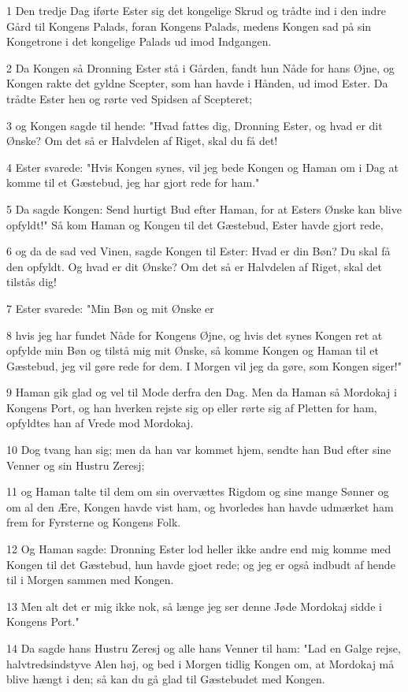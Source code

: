\par 1 Den tredje Dag iførte Ester sig det kongelige Skrud og trådte ind i den indre Gård til Kongens Palads, foran Kongens Palads, medens Kongen sad på sin Kongetrone i det kongelige Palads ud imod Indgangen.
\par 2 Da Kongen så Dronning Ester stå i Gården, fandt hun Nåde for hans Øjne, og Kongen rakte det gyldne Scepter, som han havde i Hånden, ud imod Ester. Da trådte Ester hen og rørte ved Spidsen af Scepteret;
\par 3 og Kongen sagde til hende: "Hvad fattes dig, Dronning Ester, og hvad er dit Ønske? Om det så er Halvdelen af Riget, skal du få det!
\par 4 Ester svarede: "Hvis Kongen synes, vil jeg bede Kongen og Haman om i Dag at komme til et Gæstebud, jeg har gjort rede for ham."
\par 5 Da sagde Kongen: Send hurtigt Bud efter Haman, for at Esters Ønske kan blive opfyldt!" Så kom Haman og Kongen til det Gæstebud, Ester havde gjort rede,
\par 6 og da de sad ved Vinen, sagde Kongen til Ester: Hvad er din Bøn? Du skal få den opfyldt. Og hvad er dit Ønske? Om det så er Halvdelen af Riget, skal det tilstås dig!
\par 7 Ester svarede: "Min Bøn og mit Ønske er
\par 8 hvis jeg har fundet Nåde for Kongens Øjne, og hvis det synes Kongen ret at opfylde min Bøn og tilstå mig mit Ønske, så komme Kongen og Haman til et Gæstebud, jeg vil gøre rede for dem. I Morgen vil jeg da gøre, som Kongen siger!"
\par 9 Haman gik glad og vel til Mode derfra den Dag. Men da Haman så Mordokaj i Kongens Port, og han hverken rejste sig op eller rørte sig af Pletten for ham, opfyldtes han af Vrede mod Mordokaj.
\par 10 Dog tvang han sig; men da han var kommet hjem, sendte han Bud efter sine Venner og sin Hustru Zeresj;
\par 11 og Haman talte til dem om sin overvættes Rigdom og sine mange Sønner og om al den Ære, Kongen havde vist ham, og hvorledes han havde udmærket ham frem for Fyrsterne og Kongens Folk.
\par 12 Og Haman sagde: Dronning Ester lod heller ikke andre end mig komme med Kongen til det Gæstebud, hun havde gjoet rede; og jeg er også indbudt af hende til i Morgen sammen med Kongen.
\par 13 Men alt det er mig ikke nok, så længe jeg ser denne Jøde Mordokaj sidde i Kongens Port."
\par 14 Da sagde hans Hustru Zeresj og alle hans Venner til ham: "Lad en Galge rejse, halvtredsindstyve Alen høj, og bed i Morgen tidlig Kongen om, at Mordokaj må blive hængt i den; så kan du gå glad til Gæstebudet med Kongen.

